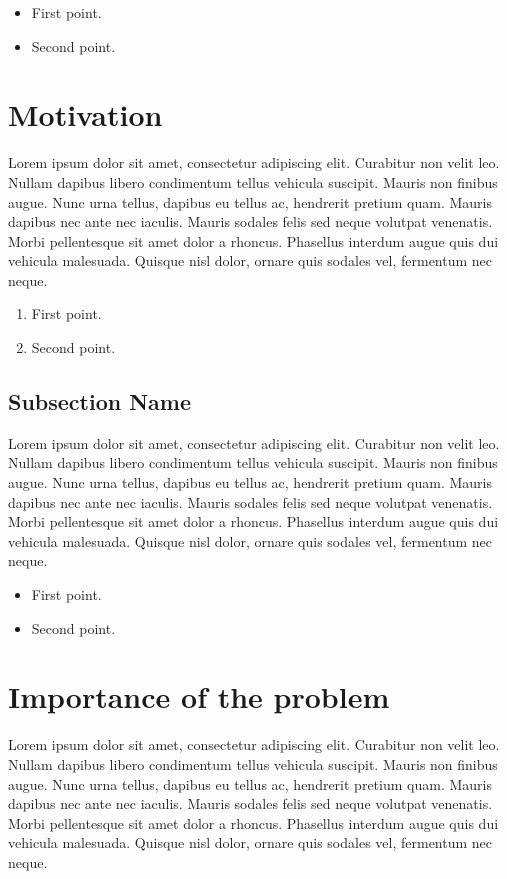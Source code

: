 \documentclass[12pt,a4paper]{report}
\begin{document}
\begin{itemize}
\item First point.
\item Second point.
\end{itemize}

\section{Motivation}
Lorem ipsum dolor sit amet, consectetur adipiscing elit. Curabitur non velit leo. Nullam dapibus libero condimentum tellus vehicula suscipit. Mauris non finibus augue. Nunc urna tellus, dapibus eu tellus ac, hendrerit pretium quam. Mauris dapibus nec ante nec iaculis. Mauris sodales felis sed neque volutpat venenatis. Morbi pellentesque sit amet dolor a rhoncus. Phasellus interdum augue quis dui vehicula malesuada. Quisque nisl dolor, ornare quis sodales vel, fermentum nec neque. 

\begin{enumerate}
\item First point.
\item Second point.
\end{enumerate}

\subsection{Subsection Name}
Lorem ipsum dolor sit amet, consectetur adipiscing elit. Curabitur non velit leo. Nullam dapibus libero condimentum tellus vehicula suscipit. Mauris non finibus augue. Nunc urna tellus, dapibus eu tellus ac, hendrerit pretium quam. Mauris dapibus nec ante nec iaculis. Mauris sodales felis sed neque volutpat venenatis. Morbi pellentesque sit amet dolor a rhoncus. Phasellus interdum augue quis dui vehicula malesuada. Quisque nisl dolor, ornare quis sodales vel, fermentum nec neque. 

\begin{itemize}
\item First point.
\item Second point.
\end{itemize}

\section{Importance of the problem}
Lorem ipsum dolor sit amet, consectetur adipiscing elit. Curabitur non velit leo. Nullam dapibus libero condimentum tellus vehicula suscipit. Mauris non finibus augue. Nunc urna tellus, dapibus eu tellus ac, hendrerit pretium quam. Mauris dapibus nec ante nec iaculis. Mauris sodales felis sed neque volutpat venenatis. Morbi pellentesque sit amet dolor a rhoncus. Phasellus interdum augue quis dui vehicula malesuada. Quisque nisl dolor, ornare quis sodales vel, fermentum nec neque. 
\end{document}
